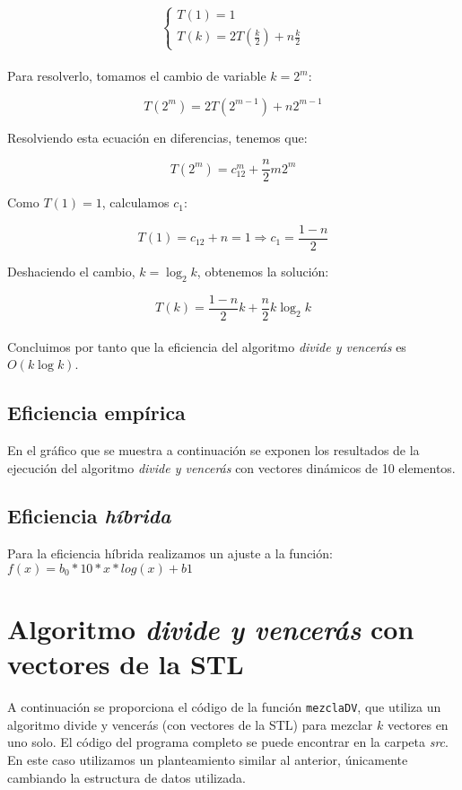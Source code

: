 \documentclass[11pt]{article}
\begin{document}
$$ \begin{cases} T(1) = 1\\ T(k) = 2T\left(\frac{k}{2}\right) + n\frac{k}{2} \end{cases} $$\\

Para resolverlo, tomamos el cambio de variable $ k = 2^m $:

$$ T(2^m) = 2T(2^{m-1}) + n2^{m-1} $$

Resolviendo esta ecuación en diferencias, tenemos que:

$$ T(2^m) = c_12^m + \frac{n}{2}m2^{m} $$

Como $T(1) = 1$, calculamos $c_1$:

$$ T(1) = c_12 + n = 1 \Rightarrow c_1 = \frac{1-n}{2}$$

Deshaciendo el cambio, $k = \log_2 k$, obtenemos la solución:

$$T(k) = \frac{1-n}{2}k + \frac{n}{2}k\log_2 k$$\\

Concluimos por tanto que la eficiencia del algoritmo \textit{divide y vencerás} es $O(k\log k)$.

\subsection*{Eficiencia empírica}

En el gráfico que se muestra a continuación se exponen los resultados de la
ejecución del algoritmo \textit{divide y vencerás} con vectores dinámicos de 10 elementos.
 \enlargethispage{5\baselineskip}
\begin{center}
	
\end{center}

\subsection*{Eficiencia \textit{híbrida}}
Para la eficiencia híbrida realizamos un ajuste a la función: $f(x) = b_0*10*x*log(x) + b1$
\begin{center}
	
\end{center}

\section*{Algoritmo \textit{divide y vencerás} con vectores de la STL}


A continuación se proporciona el código de la función \texttt{mezclaDV},
que utiliza un algoritmo divide y vencerás (con vectores de la STL) para mezclar $k$ vectores en uno solo. El
código del programa completo se puede encontrar en la carpeta \textit{src}.\\
En este caso utilizamos un planteamiento similar al anterior, únicamente cambiando la estructura de datos utilizada.
\end{document}
